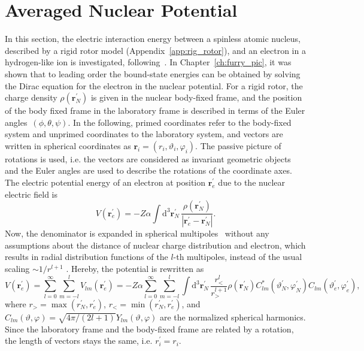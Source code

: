 \section{Averaged Nuclear Potential}
\label{sec:gfac_avpot}
In this section, the electric interaction energy between a spinless atomic nucleus, described by a rigid rotor model (Appendix~\ref{app:rig_rotor}), and an electron in a hydrogen-like ion is investigated, following~\cite{kozhedub2008,jacek2012}. In Chapter~\ref{ch:furry_pic}, it was shown that to leading order the bound-state energies can be obtained by solving the Dirac equation for the electron in the nuclear potential. For a rigid rotor, the charge density $\rho(\mathbf{r}^{\prime}_N)$ is given in the nuclear body-fixed frame, and the position of the body fixed frame in the laboratory frame is described in terms of the Euler angles~$(\phi,\theta,\psi)$. In the following, primed coordinates refer to the body-fixed system and unprimed coordinates to the laboratory system, and vectors are written in spherical coordinates as $\mathbf{r}_i=(r_i,\vartheta_i,\varphi_i)$. The passive picture of rotations is used, i.e. the vectors are considered as invariant geometric objects and the Euler angles are used to describe the rotations of the coordinate axes. The electric potential energy of an electron at position $\mathbf{r}_{e}^\prime$ due to the nuclear electric field is
\begin{equation}
V(\mathbf{r}_e^\prime)=-Z\alpha \int\mathrm{d}^3\mathbf{r}_N^\prime\,
\frac{\rho(\mathbf{r}_N^\prime)}{\left|\mathbf{r}_e^\prime - \mathbf{r}_N^\prime\right|}.
\end{equation}
Now, the denominator is expanded in spherical multipoles~\cite{jackson1999} without any assumptions about the distance of nuclear charge distribution and electron, which results in radial distribution functions of the $l$-th multipoles, instead of the usual scaling $\sim 1/r^{l+1}$ . Hereby, the potential is rewritten as
\begin{equation}
V(\mathbf{r}_e^\prime)=\sum_{l=0}^\infty \sum_{m=-l}^l V_{lm}(\mathbf{r}_e^\prime)=-Z\alpha \sum_{l=0}^\infty \sum_{m=-l}^l
\int\mathrm{d}^3\mathbf{r}_N^{\prime}\,\frac{r_<^l}{r_>^{l+1}}\rho(\mathbf{r}_N^\prime) C_{lm}^*(\vartheta^\prime_N,\varphi_N^\prime) C_{lm}(\vartheta^\prime_e,\varphi_e^\prime),
\label{eq:mulitipoles_1}
\end{equation}
where $r_>=\max(r^\prime_N,r^\prime_e)$, $r_<=\min(r^\prime_N,r^\prime_e)$, and $C_{lm}(\vartheta,\varphi)=\sqrt{4\pi/(2l+1)}Y_{lm}(\vartheta,\varphi)$ are the normalized spherical harmonics. Since the laboratory frame and the body-fixed frame are related by a rotation, the length of vectors stays the same, i.e. $r^\prime_i = r_i$.
